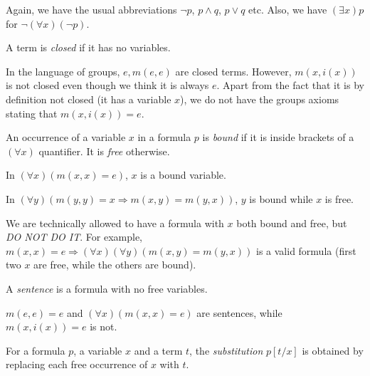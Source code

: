 \documentclass[a4paper]{article}
\begin{document}
Again, we have the usual abbreviations $\neg p$, $p\wedge q$, $p\vee q$ etc. Also, we have $(\exists x)p$ for $\neg(\forall x)(\neg p)$.

\begin{defi}
  A term is \emph{closed} if it has no variables.
\end{defi}

\begin{eg}
  In the language of groups, $e, m(e, e)$ are closed terms. However, $m(x, i(x))$ is not closed even though we think it is always $e$. Apart from the fact that it is by definition not closed (it has a variable $x$), we do not have the groups axioms stating that $m(x, i(x)) = e$.
\end{eg}

\begin{defi}
  An occurrence of a variable $x$ in a formula $p$ is \emph{bound} if it is inside brackets of a $(\forall x)$ quantifier. It is \emph{free} otherwise.
\end{defi}

\begin{eg}
  In $(\forall x)(m(x, x) = e)$, $x$ is a bound variable.

  In $(\forall y)(m(y, y) = x \Rightarrow m(x, y) = m(y, x))$, $y$ is bound while $x$ is free.

  We are technically allowed to have a formula with $x$ both bound and free, but \emph{DO NOT DO IT}. For example, $m(x, x) = e \Rightarrow (\forall x)(\forall y)(m(x, y) = m(y, x))$ is a valid formula (first two $x$ are free, while the others are bound).
\end{eg}

\begin{defi}[Sentence]
  A \emph{sentence} is a formula with no free variables.
\end{defi}

\begin{eg}
  $m(e, e) = e$ and $(\forall x)(m(x, x) = e)$ are sentences, while $m(x, i(x)) = e$ is not.
\end{eg}

\begin{defi}[Substitution]
  For a formula $p$, a variable $x$ and a term $t$, the \emph{substitution} $p[t/x]$ is obtained by replacing each free occurrence of $x$ with $t$.
\end{defi}
\end{document}

